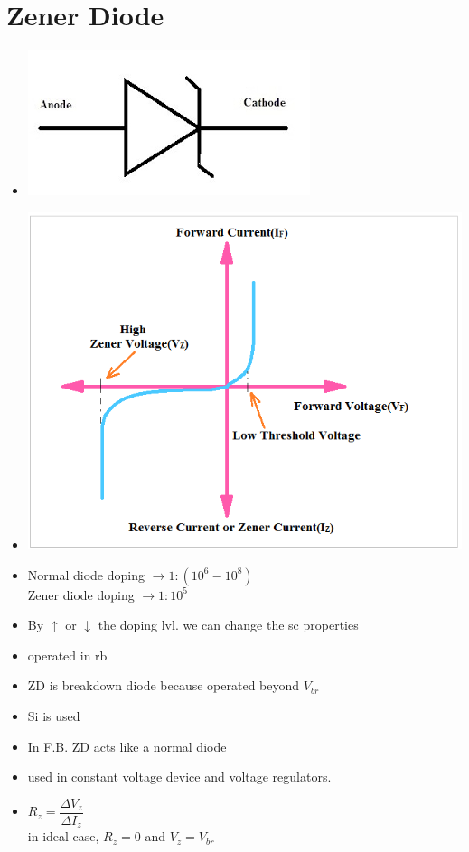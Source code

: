 \documentclass[10pt, a4paper]{report}
\begin{document}
	\section{Zener Diode}
	\begin{itemize}
		\item \includegraphics[width=0.5\linewidth]{img/zd symbol}
		\item \includegraphics[width=\linewidth]{img/Zener diode characteristics}
		\item Normal diode doping $\rightarrow 1: (10^6 - 10^8)$ \\ Zener diode doping $\rightarrow 1: 10^5$
		\item By $\uparrow$ or $\downarrow$ the doping lvl. we can change the sc properties
		\item operated in rb
		\item ZD is breakdown diode because operated beyond $ V_{br} $
		\item Si is used
		\item In F.B. ZD acts like a normal diode
		\item used in constant voltage device and voltage regulators.
		\item $ R_z = \dfrac{\Delta V_z}{\Delta I_z} $ \\ in ideal case, $ R_z = 0 $ and $ V_z = V_{br} $
	\end{itemize}
\end{document}
